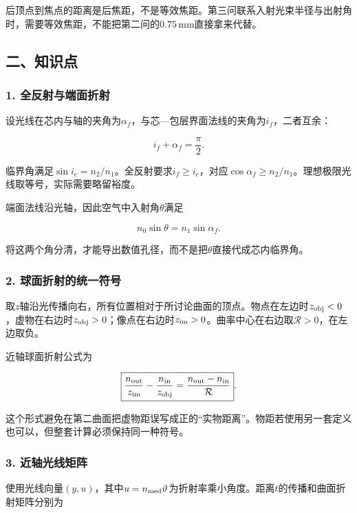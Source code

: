 \documentclass[12pt,a4paper,fontset=fandol]{ctexart}
\begin{document}
后顶点到焦点的距离是后焦距，不是等效焦距。第三问联系入射光束半径与出射角时，需要等效焦距，不能把第二问的\(0.75\,\mathrm{mm}\)直接拿来代替。

\subsection{二、知识点}\label{ux4e8cux77e5ux8bc6ux70b9-4}

\subsubsection{1.
全反射与端面折射}\label{ux5168ux53cdux5c04ux4e0eux7aefux9762ux6298ux5c04}

设光线在芯内与轴的夹角为\(\alpha_f\)，与芯---包层界面法线的夹角为\(i_f\)，二者互余：

\[
i_f+\alpha_f=\frac{\pi}{2}.
\]

临界角满足\(\sin i_c=n_2/n_1\)。全反射要求\(i_f\ge i_c\)，对应\(\cos\alpha_f\ge n_2/n_1\)。理想极限光线取等号，实际需要略留裕度。

端面法线沿光轴，因此空气中入射角\(\theta\)满足

\[
n_0\sin\theta=n_1\sin\alpha_f.
\]

将这两个角分清，才能导出数值孔径，而不是把\(\theta\)直接代成芯内临界角。

\subsubsection{2.
球面折射的统一符号}\label{ux7403ux9762ux6298ux5c04ux7684ux7edfux4e00ux7b26ux53f7}

取\(z\)轴沿光传播向右，所有位置相对于所讨论曲面的顶点。物点在左边时\(z_{\rm obj}<0\)，虚物在右边时\(z_{\rm obj}>0\)；像点在右边时\(z_{\rm im}>0\)。曲率中心在右边取\(\mathcal R>0\)，在左边取负。

近轴球面折射公式为

\[
\boxed{
\frac{n_{\rm out}}{z_{\rm im}}
-\frac{n_{\rm in}}{z_{\rm obj}}
=\frac{n_{\rm out}-n_{\rm in}}{\mathcal R}}.
\]

这个形式避免在第二曲面把虚物距误写成正的``实物距离''。物距若使用另一套定义也可以，但整套计算必须保持同一种符号。

\subsubsection{3.
近轴光线矩阵}\label{ux8fd1ux8f74ux5149ux7ebfux77e9ux9635}

使用光线向量\((y,u)\)，其中\(u=n_{\rm med}\vartheta\)为折射率乘小角度。距离\(t\)的传播和曲面折射矩阵分别为
\end{document}
